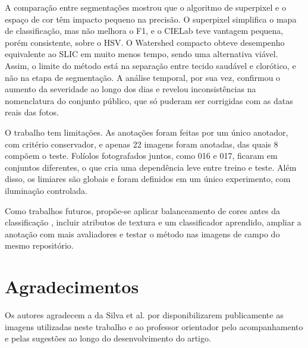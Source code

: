 \documentclass[10pt,a4paper,twocolumn]{article}
\begin{document}
A comparação entre segmentações mostrou que o algoritmo de superpixel e
o espaço de cor têm impacto pequeno na precisão. O superpixel simplifica
o mapa de classificação, mas não melhora o F1, e o CIELab teve vantagem
pequena, porém consistente, sobre o HSV. O Watershed compacto obteve
desempenho equivalente ao SLIC em muito menos tempo, sendo uma
alternativa viável. Assim, o limite do método está na separação entre
tecido saudável e clorótico, e não na etapa de segmentação. A análise
temporal, por sua vez, confirmou o aumento da severidade ao longo dos
dias e revelou inconsistências na nomenclatura do conjunto público, que
só puderam ser corrigidas com as datas reais das fotos.

O trabalho tem limitações. As anotações foram feitas por um único
anotador, com critério conservador, e apenas 22 imagens foram anotadas,
das quais 8 compõem o teste. Folíolos fotografados juntos, como 016 e
017, ficaram em conjuntos diferentes, o que cria uma dependência leve
entre treino e teste. Além disso, os limiares são globais e foram
definidos em um único experimento, com iluminação controlada.

Como trabalhos futuros, propõe-se aplicar balanceamento de cores antes
da classificação \cite{khan2022}, incluir atributos de textura e um
classificador aprendido, ampliar a anotação com mais avaliadores e
testar o método nas imagens de campo do mesmo repositório.

\section*{Agradecimentos}

Os autores agradecem a da Silva et al. \cite{dasilva2022} por disponibilizarem publicamente as imagens utilizadas neste trabalho e ao professor orientador pelo acompanhamento e pelas sugestões ao longo do desenvolvimento do artigo.

{\small


}
\end{document}
